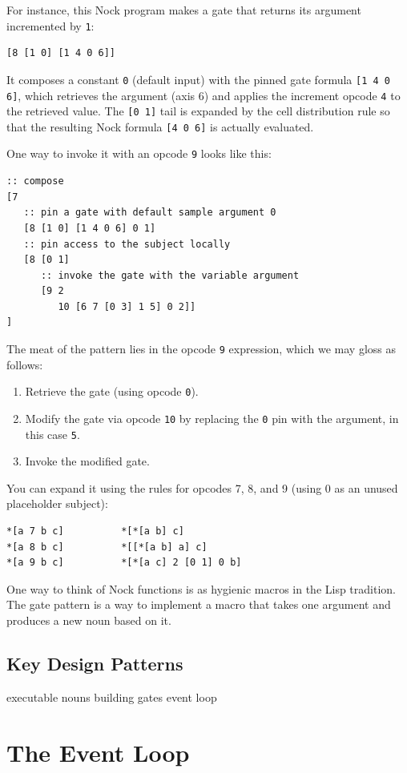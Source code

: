 For instance, this Nock program makes a gate that returns its argument incremented by \lstinline[style=inlinecode]{1}:

\begin{lstlisting}[style=listingblock]
[8 [1 0] [1 4 0 6]]
\end{lstlisting}

It composes a constant \lstinline[style=inlinecode]{0} (default input) with the pinned gate formula \lstinline[style=inlinecode]{[1 4 0 6]}, which retrieves the argument (axis 6) and applies the increment opcode \lstinline[style=inlinecode]{4} to the retrieved value.  The \lstinline[style=inlinecode]{[0 1]} tail is expanded by the cell distribution rule so that the resulting Nock formula \lstinline[style=inlinecode]{[4 0 6]} is actually evaluated.

One way to invoke it with an opcode \lstinline[style=inlinecode]{9} looks like this:

\begin{lstlisting}[style=listingblock]
:: compose
[7
   :: pin a gate with default sample argument 0
   [8 [1 0] [1 4 0 6] 0 1]
   :: pin access to the subject locally
   [8 [0 1]
      :: invoke the gate with the variable argument
      [9 2
         10 [6 7 [0 3] 1 5] 0 2]]
]
\end{lstlisting}

The meat of the pattern lies in the opcode \lstinline[style=inlinecode]{9} expression, which we may gloss as follows:

\begin{enumerate}
  \item  Retrieve the gate (using opcode \lstinline[style=inlinecode]{0}).
  \item  Modify the gate via opcode \lstinline[style=inlinecode]{10} by replacing the \lstinline[style=inlinecode]{0} pin with the argument, in this case \lstinline[style=inlinecode]{5}.
  \item  Invoke the modified gate.
\end{enumerate}

You can expand it using the rules for opcodes 7, 8, and 9 (using 0 as an unused placeholder subject):

\begin{lstlisting}[style=listingblock]
*[a 7 b c]          *[*[a b] c]
*[a 8 b c]          *[[*[a b] a] c]
*[a 9 b c]          *[*[a c] 2 [0 1] 0 b]
\end{lstlisting}

One way to think of Nock functions is as hygienic macros in the Lisp tradition. The gate pattern is a way to implement a macro that takes one argument and produces a new noun based on it.

\subsection{Key Design Patterns}

executable nouns
building gates
event loop

\section{The Event Loop}
